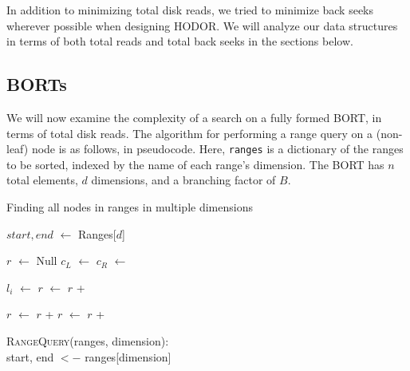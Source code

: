\documentclass[11pt, oneside]{article}
\newcommand*\Let[2]{\State #1 $\gets$ #2}
\newcommand{\ms}{\texttt}
\begin{document}

In addition to minimizing total disk reads, we tried to minimize back seeks
wherever possible when designing HODOR. We will analyze our data structures in
terms of both total reads and total back seeks in the sections below.

\subsection{BORTs}

We will now examine the complexity of a search on a fully formed BORT, in terms
of total disk reads. The algorithm for performing a range query on a (non-leaf)
node is as follows, in pseudocode. Here, \ms{ranges} is a dictionary of the
ranges to be sorted, indexed by the name of each range's dimension. The BORT has
$n$ total elements, $d$ dimensions, and a branching factor of $B$.

\begin{algorithm}
    \caption{Finding all nodes in ranges in multiple dimensions}
    \begin{algorithmic}[1]
        \Statex
            \Let{$start, end$}{Ranges[$d$]}
                \State \Return{}
            \EndIf
            
            \State
            \Let{$r$}{Null}
            \Let{$c_L$}{}
            \Let{$c_R$}{}
            \State {}
            \State

                \State {}
                \Let{$l_i$}{}
                \Let{$r$}{$r$ + }
            \EndFor

            \State
            \State {}
            
            \Let{$r$}{$r$ + }
            \Let{$r$}{$r$ + }

            \State {}
        \EndFunction
    \end{algorithmic}
\end{algorithm}
\textsc{RangeQuery}(ranges, dimension): \\
    start, end $<-$ ranges[dimension] \\
    
\end{document}
